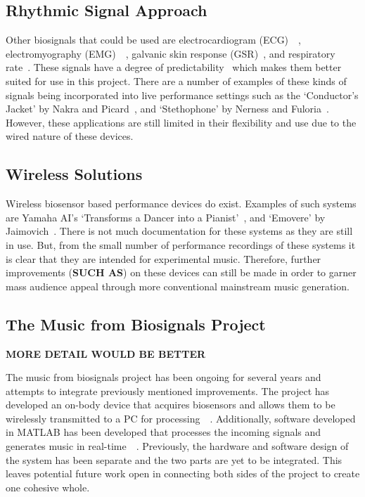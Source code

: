 \subsection{Rhythmic Signal Approach}
Other biosignals that could be used are electrocardiogram (ECG)~\cite{Afonso:1999}~\cite{Pan:1985},
electromyography (EMG)~\cite{Tanaka:2002}~\cite{Young:2013}, galvanic skin response (GSR)~\cite{Kurniawan:2013}, and respiratory rate~\cite{Carlos:2011}.
These signals have a degree of predictability~\cite{Tahiroğlu:2008} which makes them better suited for use in this project.
There are a number of examples of these kinds of signals being incorporated into live performance settings such as
the `Conductor's Jacket' by Nakra and Picard~\cite{Nakra:1998}, and `Stethophone' by Nerness and Fuloria~\cite{Nerness:2019}.
However, these applications are still limited in their flexibility and use due to the wired nature of these devices.

\subsection{Wireless Solutions}
Wireless biosensor based performance devices do exist.
Examples of such systems are Yamaha AI's `Transforms a Dancer into a Pianist'~\cite{Yamaha:2018}, and `Emovere' by Jaimovich~\cite{Jaimovich:2016}.
There is not much documentation for these systems as they are still in use.
But, from the small number of performance recordings of these systems it is clear that they are intended for experimental music.
Therefore, further improvements (\textbf{SUCH AS}) on these devices can still be made in order to garner mass audience appeal through more conventional mainstream music generation.

\subsection{The Music from Biosignals Project}
\textbf{MORE DETAIL WOULD BE BETTER}

The music from biosignals project has been ongoing for several years and attempts to integrate previously mentioned improvements.
The project has developed an on-body device that acquires biosensors and allows them to be wirelessly transmitted to a PC for processing~\cite{Pierro:2019}~\cite{Tran:2022}.
Additionally, software developed in MATLAB has been developed that processes the incoming signals and generates music in real-time~\cite{Chen:2016}~\cite{Nicholls:2019}.
Previously, the hardware and software design of the system has been separate and the two parts are yet to be integrated.
This leaves potential future work open in connecting both sides of the project to create one cohesive whole.

